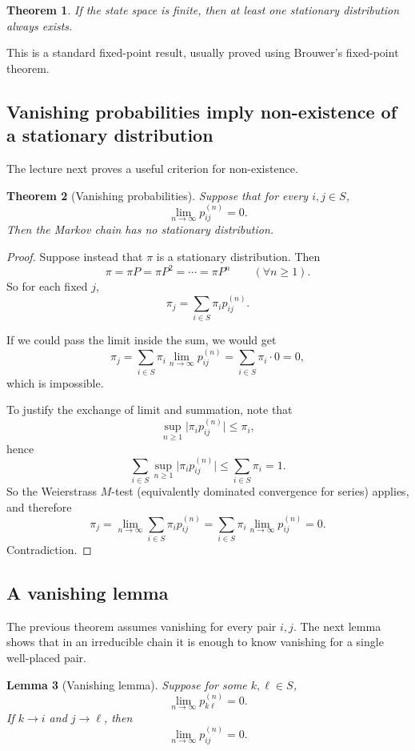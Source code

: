 \documentclass[11pt]{article}
\newtheorem{theorem}{Theorem}[section]
\newtheorem{lemma}[theorem]{Lemma}
\theoremstyle{definition}
\begin{document}
\begin{theorem}
If the state space is finite, then at least one stationary distribution always exists.
\end{theorem}

This is a standard fixed-point result, usually proved using Brouwer's fixed-point theorem.

\subsection{Vanishing probabilities imply non-existence of a stationary distribution}

The lecture next proves a useful criterion for non-existence.

\begin{theorem}[Vanishing probabilities]
Suppose that for every \(i,j\in S\),
\[
\lim_{n\to\infty} p_{ij}^{(n)}=0.
\]
Then the Markov chain has no stationary distribution.
\end{theorem}

\begin{proof}
Suppose instead that \(\pi\) is a stationary distribution. Then
\[
\pi=\pi P=\pi P^2=\cdots=\pi P^n
\qquad (\forall n\ge 1).
\]
So for each fixed \(j\),
\[
\pi_j
=
\sum_{i\in S}\pi_i p_{ij}^{(n)}.
\]

If we could pass the limit inside the sum, we would get
\[
\pi_j
=
\sum_{i\in S}\pi_i \lim_{n\to\infty} p_{ij}^{(n)}
=
\sum_{i\in S}\pi_i \cdot 0
=
0,
\]
which is impossible.

To justify the exchange of limit and summation, note that
\[
\sup_{n\ge 1}\bigl|\pi_i p_{ij}^{(n)}\bigr|
\le \pi_i,
\]
hence
\[
\sum_{i\in S}\sup_{n\ge 1}\bigl|\pi_i p_{ij}^{(n)}\bigr|
\le
\sum_{i\in S}\pi_i
=
1.
\]
So the Weierstrass \(M\)-test (equivalently dominated convergence for series) applies, and therefore
\[
\pi_j
=
\lim_{n\to\infty}\sum_{i\in S}\pi_i p_{ij}^{(n)}
=
\sum_{i\in S}\pi_i \lim_{n\to\infty}p_{ij}^{(n)}
=
0.
\]
Contradiction.
\end{proof}

\subsection{A vanishing lemma}

The previous theorem assumes vanishing for every pair \(i,j\). The next lemma shows that in an irreducible chain it is enough to know vanishing for a single well-placed pair.

\begin{lemma}[Vanishing lemma]
Suppose for some \(k,\ell\in S\),
\[
\lim_{n\to\infty} p_{k\ell}^{(n)}=0.
\]
If \(k\to i\) and \(j\to \ell\), then
\[
\lim_{n\to\infty} p_{ij}^{(n)}=0.
\]
\end{lemma}
\end{document}
